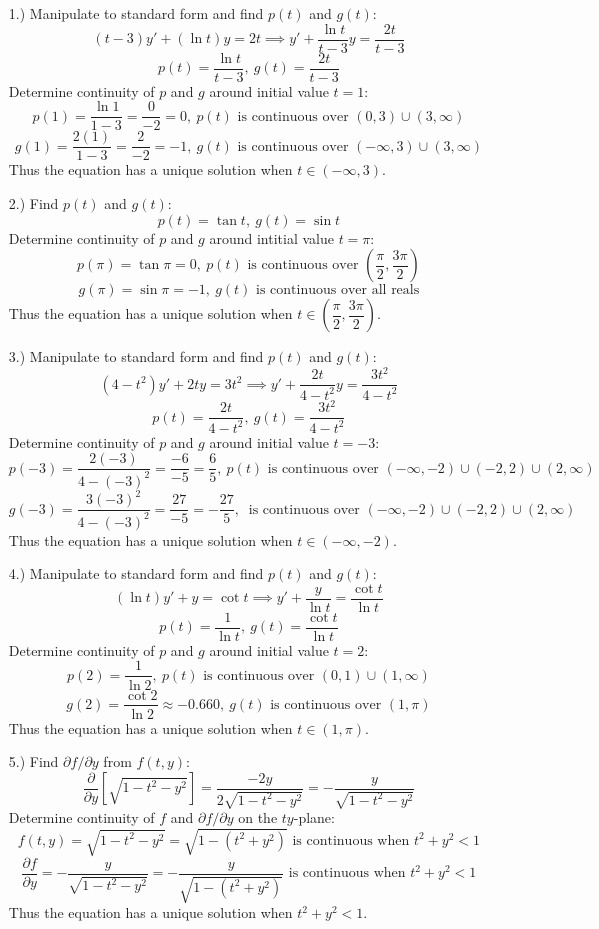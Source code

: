 \documentclass[12pt]{article}
\newcommand{\bracks}[1]{\left[#1\right]}
\begin{document}
\pagestyle{fancy}
\fancyhead{}

\normalsize
\begin{itemize}
    \item [1.)] Manipulate to standard form and find $p(t)$ and $g(t)$:
    \[(t-3)y'+(\ln t)y=2t\implies y'+\frac{\ln t}{t-3}y=\frac{2t}{t-3}\]
    \[p(t)=\frac{\ln t}{t-3},\ g(t)=\frac{2t}{t-3}\]
    Determine continuity of $p$ and $g$ around initial value $t=1$:
    \[p(1)=\frac{\ln1}{1-3}=\frac{0}{-2}=0,\ p(t)\text{ is continuous over }(0,3)\cup(3,\infty)\]
    \[g(1)=\frac{2(1)}{1-3}=\frac{2}{-2}=-1,\ g(t)\text{ is continuous over }(-\infty,3)\cup(3,\infty)\]
    Thus the equation has a unique solution when $t\in(-\infty,3)$.

    \item [2.)] Find $p(t)$ and $g(t)$:
    \[p(t)=\tan t,\ g(t)=\sin t\]
    Determine continuity of $p$ and $g$ around intitial value $t=\pi$:
    \[p(\pi)=\tan\pi=0,\ p(t)\text{ is continuous over } \left(\frac{\pi}{2},\frac{3\pi}{2}\right)\]
    \[g(\pi)=\sin\pi=-1,\ g(t)\text{ is continuous over all reals}\]
    Thus the equation has a unique solution when $t\in\left(\dfrac{\pi}{2},\dfrac{3\pi}{2}\right)$.

    \item [3.)] Manipulate to standard form and find $p(t)$ and $g(t)$:
    \[(4-t^2)y'+2ty=3t^2\implies y'+\frac{2t}{4-t^2}y=\frac{3t^2}{4-t^2}\]
    \[p(t)=\frac{2t}{4-t^2},\ g(t)=\frac{3t^2}{4-t^2}\]
    Determine continuity of $p$ and $g$ around initial value $t=-3$:
    \[p(-3)=\frac{2(-3)}{4-(-3)^2}=\frac{-6}{-5}=\frac{6}{5},\ p(t)\text{ is continuous over }(-\infty,-2)\cup(-2,2)\cup(2,\infty)\]
    \[g(-3)=\frac{3(-3)^2}{4-(-3)^2}=\frac{27}{-5}=-\frac{27}{5},\ \text{ is continuous over }(-\infty,-2)\cup(-2,2)\cup(2,\infty)\]
    Thus the equation has a unique solution when $t\in(-\infty,-2)$.

    \item [4.)] Manipulate to standard form and find $p(t)$ and $g(t)$:
    \[(\ln t)y'+y=\cot t\implies y'+\frac{y}{\ln t}=\frac{\cot t}{\ln t}\]
    \[p(t)=\frac{1}{\ln t},\ g(t)=\frac{\cot t}{\ln t}\]
    Determine continuity of $p$ and $g$ around initial value $t=2$:
    \[p(2)=\frac{1}{\ln2},\ p(t)\text{ is continuous over }(0,1)\cup(1,\infty)\]
    \[g(2)=\frac{\cot2}{\ln2}\approx-0.660,\ g(t)\text{ is continuous over }(1,\pi)\]
    Thus the equation has a unique solution when $t\in(1,\pi)$.

    \item [5.)] Find $\partial f/\partial y$ from $f(t,y)$:
    \[\frac{\partial}{\partial y}\bracks{\sqrt{1-t^2-y^2}}=\frac{-2y}{2\sqrt{1-t^2-y^2}}=-\frac{y}{\sqrt{1-t^2-y^2}}\]
    Determine continuity of $f$ and $\partial f/\partial y$ on the $ty$-plane:
    \[f(t,y)=\sqrt{1-t^2-y^2}=\sqrt{1-(t^2+y^2)}\text{ is continuous when }t^2+y^2<1\]
    \[\frac{\partial f}{\partial y}=-\frac{y}{\sqrt{1-t^2-y^2}}=-\frac{y}{\sqrt{1-(t^2+y^2)}}\text{ is continuous when }t^2+y^2<1\]
    Thus the equation has a unique solution when $t^2+y^2<1$.


\end{itemize}
\end{document}
